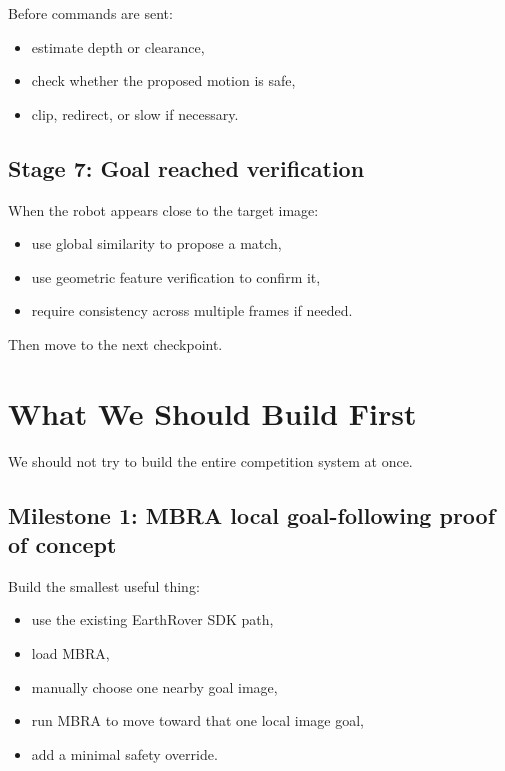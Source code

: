 \documentclass[11pt,a4paper]{article}
\begin{document}
Before commands are sent:
\begin{itemize}[nosep]
  \item estimate depth or clearance,
  \item check whether the proposed motion is safe,
  \item clip, redirect, or slow if necessary.
\end{itemize}

\subsection{Stage 7: Goal reached verification}

When the robot appears close to the target image:
\begin{itemize}[nosep]
  \item use global similarity to propose a match,
  \item use geometric feature verification to confirm it,
  \item require consistency across multiple frames if needed.
\end{itemize}

Then move to the next checkpoint.


\section{What We Should Build First}

We should not try to build the entire competition system at once.

\subsection{Milestone 1: MBRA local goal-following proof of concept}

Build the smallest useful thing:
\begin{itemize}[nosep]
  \item use the existing EarthRover SDK path,
  \item load MBRA,
  \item manually choose one nearby goal image,
  \item run MBRA to move toward that one local image goal,
  \item add a minimal safety override.
\end{itemize}
\end{document}
